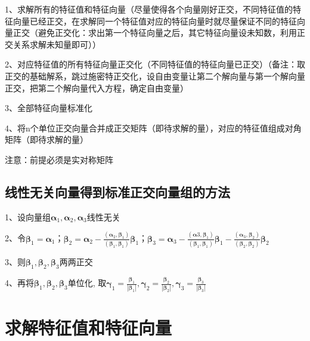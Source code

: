 1、求解所有的特征值和特征向量（尽量使得各个向量刚好正交，不同特征值的特征向量已经正交，在求解同一个特征值对应的特征向量时就尽量保证不同的特征向量正交（避免正交化：求出第一个特征向量之后，其它特征向量设未知数，利用正交关系求解未知量即可））

2、对应特征值的所有特征向量正交化（不同特征值的特征向量已正交）（备注：取正交的基础解系，跳过施密特正交化，设自由变量让第二个解向量与第一个解向量正交，把第二个解向量代入方程，确定自由变量）

3、全部特征向量标准化

4、将n个单位正交向量合并成正交矩阵（即待求解的量），对应的特征值组成对角矩阵（即待求解的量）

注意：前提必须是实对称矩阵



\subsection{线性无关向量得到标准正交向量组的方法}

1、设向量组$\boldsymbol{\alpha}_{1}, \boldsymbol{\alpha}_{2}, \boldsymbol{\alpha}_{3}$线性无关

2、令$\boldsymbol{\beta}_{1}=\boldsymbol{\alpha}_{1}$；$\boldsymbol{\beta}_{2}=\boldsymbol{\alpha}_{2}-\frac{\left(\boldsymbol{\alpha}_{2}, \boldsymbol{\beta}_{1}\right)}{\left(\boldsymbol{\beta}_{1}, \boldsymbol{\beta}_{1}\right)} \boldsymbol{\beta}_{1}$；$\boldsymbol{\beta}_{3}=\boldsymbol{\alpha}_{3}-\frac{\left(\boldsymbol{\alpha}{3}, \boldsymbol{\beta}_{1}\right)}{\left(\boldsymbol{\beta}_{1}, \boldsymbol{\beta}_{1}\right)} \boldsymbol{\beta}_{1}-\frac{\left(\boldsymbol{\alpha}_{3}, \boldsymbol{\beta}_{2}\right)}{\left(\boldsymbol{\beta}_{2}, \boldsymbol{\beta}_{2}\right)} \boldsymbol{\beta}_{2}$

3、则$\boldsymbol{\beta}_{1}, \boldsymbol{\beta}_{2}, \boldsymbol{\beta}_{3}$两两正交

4、再将$\boldsymbol{\beta}_{1}, \boldsymbol{\beta}_{2}, \boldsymbol{\beta}_{3}$单位化, 取$\boldsymbol{\gamma}_{1}=\frac{\boldsymbol{\beta}_{1}}{\left|\boldsymbol{\beta}_{1}\right|}, \boldsymbol{\gamma}_{2}=\frac{\boldsymbol{\beta}_{2}}{\left|\boldsymbol{\beta}_{2}\right|}, \boldsymbol{\gamma}_{3}=\frac{\boldsymbol{\beta}_{3}}{\left|\boldsymbol{\beta}_{3}\right|}$



\section{求解特征值和特征向量}



